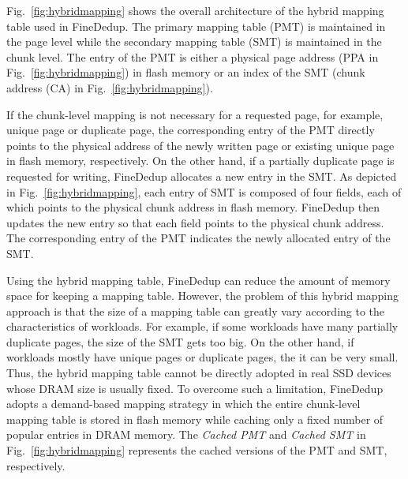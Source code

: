 Fig.~\ref{fig:hybridmapping} shows the overall architecture of the hybrid mapping table used in FineDedup.
The primary mapping table (PMT) is maintained in the page level 
while the secondary mapping table (SMT) is maintained in the chunk level.
The entry of the PMT is either a physical page address (PPA in Fig.~\ref{fig:hybridmapping}) in flash memory or 
an index of the SMT (chunk address (CA) in Fig.~\ref{fig:hybridmapping}). 

If the chunk-level mapping is not necessary for a requested page, for example, unique page or duplicate page,
the corresponding entry of the PMT directly points to the physical address of the 
newly written page or existing unique page in flash memory, respectively.
On the other hand, if a partially duplicate page is requested for writing, 
FineDedup allocates a new entry in the SMT.
As depicted in Fig.~\ref{fig:hybridmapping},
each entry of SMT is composed of four fields, each of which points to the physical chunk address 
in flash memory.
FineDedup then updates the new entry so that each field points to the physical chunk address.
The corresponding entry of the PMT indicates the newly allocated entry of the SMT.

Using the hybrid mapping table, 
FineDedup can reduce the amount of memory space for keeping a mapping table.
However, the problem of this hybrid mapping approach is that 
the size of a mapping table can greatly vary according to the characteristics of workloads.
For example, if some workloads have many partially duplicate pages, 
the size of the SMT gets too big.
On the other hand, if workloads mostly have unique pages or duplicate pages, 
the it can be very small.
Thus, the hybrid mapping table cannot be directly adopted in real SSD devices whose DRAM size is usually fixed.
To overcome such a limitation, 
FineDedup adopts a demand-based mapping strategy in which
the entire chunk-level mapping table is stored in flash memory
while caching only a fixed number of popular entries in DRAM memory.
The \textit{Cached PMT} and \textit{Cached SMT} in Fig.~\ref{fig:hybridmapping} represents the cached versions of the
PMT and SMT, respectively.

